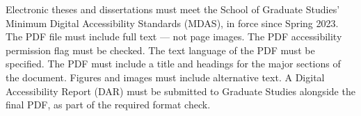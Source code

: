 %
%
\thesisrequiretagging
\thesisrequiredocumentlanguage
{}
	{Electronic theses and dissertations must meet the School of Graduate
	 Studies' Minimum Digital Accessibility Standards (MDAS), in force since
	 Spring 2023.}
	{The PDF file must include full text — not page images.}
	{The PDF accessibility permission flag must be checked.}
	{The text language of the PDF must be specified.}
	{The PDF must include a title and headings for the major sections of the
	 document.}
	{Figures and images must include alternative text.}
	{A Digital Accessibility Report (DAR) must be submitted to Graduate Studies
	 alongside the final PDF, as part of the required format check.}

%
\providecommand{\thesisdefensedate}{\thesis@date}

